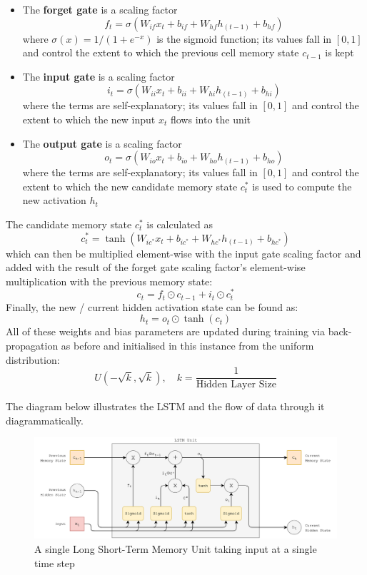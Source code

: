 \documentclass[12pt,]{article}
\providecommand{\tightlist}{%
  \setlength{\itemsep}{0pt}\setlength{\parskip}{0pt}}
\begin{document}
\begin{itemize}
\tightlist
\item
  The \textbf{forget gate} is a scaling factor
  \[f_t = \sigma(W_{if} x_t + b_{if} + W_{hf} h_{(t-1)} + b_{hf})\]
  where \(\sigma(x) = 1 / (1 + e^{-x})\) is the sigmoid function; its
  values fall in \([0,1]\) and control the extent to which the previous
  cell memory state \(c_{t-1}\) is kept
\item
  The \textbf{input gate} is a scaling factor
  \[i_t = \sigma(W_{ii} x_t + b_{ii} + W_{hi} h_{(t-1)} + b_{hi})\]
  where the terms are self-explanatory; its values fall in \([0,1]\) and
  control the extent to which the new input \(x_t\) flows into the unit
\item
  The \textbf{output gate} is a scaling factor
  \[o_t = \sigma(W_{io} x_t + b_{io} + W_{ho} h_{(t-1)} + b_{ho})\]
  where the terms are self-explanatory; its values fall in \([0,1]\) and
  control the extent to which the new candidate memory state \(c^*_t\)
  is used to compute the new activation \(h_t\)
\end{itemize}

The candidate memory state \(c^*_t\) is calculated as
\[c^*_t = \tanh(W_{ic^*} x_t + b_{ic^*} + W_{hc^*} h_{(t-1)} + b_{hc^*})\]
which can then be multiplied element-wise with the input gate scaling
factor and added with the result of the forget gate scaling factor's
element-wise multiplication with the previous memory state:
\[c_t = f_t \odot c_{t-1} + i_t \odot c^*_t\] Finally, the new / current
hidden activation state can be found as: \[h_t = o_t \odot \tanh(c_t)\]
All of these weights and bias parameters are updated during training via
back-propagation as before and initialised in this instance from the
uniform distribution:
\[U(-\sqrt{k}, \sqrt{k}),\quad k = \frac{1}{\text{Hidden Layer Size}}\]

The diagram below illustrates the LSTM and the flow of data through it
diagrammatically.

\begin{figure}
\centering
\includegraphics{Images/lstm.png}
\caption{A single Long Short-Term Memory Unit taking input at a single
time step}
\end{figure}
\end{document}
